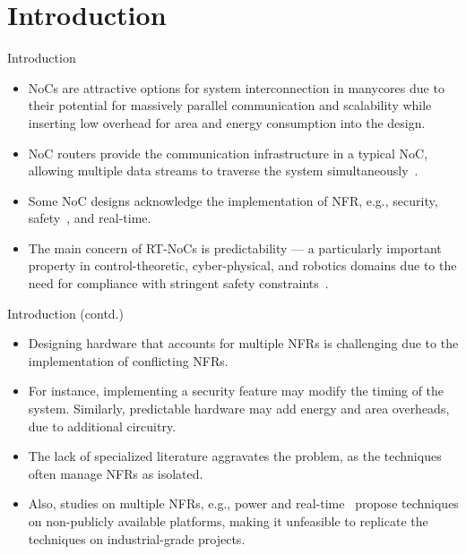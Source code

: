 \section{Introduction}

\begin{frame}{Introduction}
    \begin{itemize}
        \item NoCs are attractive options for system interconnection in
        manycores due to their potential for massively parallel communication and scalability while inserting low overhead for area and energy consumption into the design. 
        
        \item NoC routers provide the communication infrastructure in a typical NoC, allowing multiple data streams to traverse the system simultaneously~\cite{kumar:2021, benini:2002, jantsch:2005}. 
        
        \item Some NoC designs acknowledge the implementation of NFR, e.g., security, safety~\cite{Charles:2020, Guo:2020}, and real-time. 
        
        \item The main concern of RT-NoCs is predictability --- a particularly important property in control-theoretic, cyber-physical, and robotics domains due to the need for compliance with stringent safety constraints~\cite{autosar:2021, iso:asil:2020, spice:2021}.%
        
    \end{itemize}
\end{frame}

\begin{frame}{Introduction (contd.)}
	\begin{itemize}
		\item Designing hardware that accounts for multiple NFRs is challenging due to the implementation of conflicting NFRs. 
		
		\item For instance, implementing a security feature may modify the timing of the system. Similarly, predictable hardware may add energy and area overheads, due to additional circuitry.
		
		\item The lack of specialized literature aggravates the problem, as the  techniques often manage NFRs as isolated. 
		
		\item Also, studies on multiple NFRs, e.g., power and real-time~\cite{li:2023} propose techniques on non-publicly available platforms, making it unfeasible to replicate the techniques on industrial-grade projects.%
		
	\end{itemize}
\end{frame}

